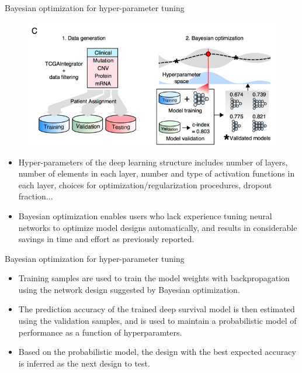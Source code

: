 \documentclass[
]{beamer}
\begin{document}
\begin{frame}[plain]{Bayesian optimization for hyper-parameter tuning}
\begin{figure}
	\includegraphics[scale=0.3]{bayes1}
\end{figure}
\begin{itemize}
	\item Hyper-parameters of the deep learning structure includes number of layers, number
	of elements in each layer,  number and type of activation functions in each layer,  choices for optimization/regularization procedures,  dropout fraction...
	\item Bayesian optimization enables users
	who lack experience tuning neural networks to optimize model designs automatically, and results in considerable
	savings in time and effort as previously reported.
\end{itemize}
\end{frame}

\begin{frame}{Bayesian optimization for hyper-parameter tuning}
\begin{itemize}
	\item Training samples are used to train the model weights with backpropagation using the network
	design suggested by Bayesian optimization.
	\item The prediction accuracy of the trained deep survival model is then
	estimated using the validation samples, and is used to maintain a probabilistic model of performance as a function
	of hyperparamters.
	\item  Based on the probabilistic model, the design with the best expected accuracy is inferred
	as the next design to test.
\end{itemize}
\end{frame}
\end{document}
